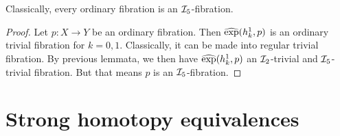 \documentclass[reqno,10pt,a4paper,oneside]{amsart}
\begin{document}
\begin{lemma}
Classically, every ordinary fibration is an $\cal{I}_5$-fibration.
\end{lemma}

\begin{proof}
Let $p : X \to Y$ be an ordinary fibration.
Then $\hatexp(h_k^1, p)$ is an ordinary trivial fibration for $k = 0, 1$.
Classically, it can be made into regular trivial fibration.
By previous lemmata, we then have $\hatexp(h_k^1, p)$ an $\cal{I}_2$-trivial and $\cal{I}_5$-trivial fibration.
But that means $p$ is an $\cal{I}_5$-fibration.
\end{proof}


\section{Strong homotopy equivalences}

\newpage











\end{document}
